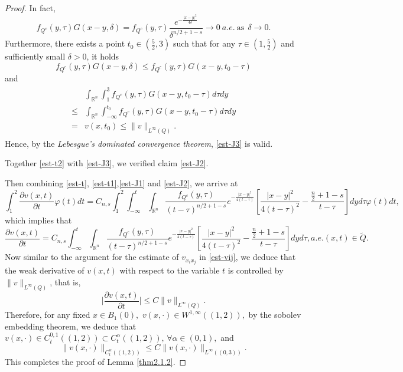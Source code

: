 \documentclass[10pt,a4paper]{amsart}
\newcommand{\R}{\mathbb{R}}
\newcommand{\mb}{\mbox}
\begin{document}
\begin{proof}
In fact,
\[f_{Q^c}(y,\tau)G(x-y,\delta)=f_{Q^c}(y,\tau)\frac{e^{-\frac{|x-y|^2}{4\delta}}}{{\delta}^{n/2+1-s}}\to 0 \ a.e.\ \mb{as}\ \ \delta\to 0. \]
 Furthermore, there exists a point $t_0\in (\frac{5}{2},3)$ such that for any $\tau\in(1,\frac{5}{2})$ and sufficiently small $\delta>0$, it holds
 \[f_{Q^c}(y,\tau)G(x-y,\delta)\leq f_{Q^c}(y,\tau)G(x-y,t_0-\tau)\]
 and \begin{eqnarray*}
\begin{aligned}
&\int_{\R^n}\int_1^3f_{Q^c}(y,\tau)G(x-y,t_0-\tau)d\tau dy\\
\leq &\int_{\R^n}\int_{-\infty}^{t_0}f_{Q^c}(y,\tau)G(x-y,t_0-\tau)d\tau dy\\
=&v(x,t_0)\leq \|v\|_{L^{\infty}(Q)}.\end{aligned}
\end{eqnarray*}
Hence, by the {\em Lebesgue's dominated convergence theorem}, \eqref{est-J3} is valid.

Together \eqref{est-t2} with \eqref{est-J3}, we verified claim \eqref{est-J2}.

Then combining \eqref{est-t}, \eqref{est-t1},\eqref{est-J1} and \eqref{est-J2}, we arrive at
\[\int_1^2\frac{\partial v(x,t)}{\partial t}\varphi(t)dt=C_{n,s}\int_1^2\int_{-\infty}^{t}\int_{\R^n}\frac{f_{Q^c}(y,\tau)}{{(t-\tau)}^{n/2+1-s}} e^{-\frac{|x-y|^2}{4(t-\tau)}}\left[\frac{|x-y|^2}{4(t-\tau)^2}-\frac{\frac{n}{2}+1-s}{t-\tau}\right]dyd\tau\varphi(t)dt,\]
which implies that
\[\frac{\partial v(x,t)}{\partial t}=C_{n,s}\int_{-\infty}^{t}\int_{\R^n}\frac{f_{Q^c}(y,\tau)}{{(t-\tau)}^{n/2+1-s}} e^{-\frac{|x-y|^2}{4(t-\tau)}}\left[\frac{|x-y|^2}{4(t-\tau)^2}-\frac{\frac{n}{2}+1-s}{t-\tau}\right]dyd\tau, a.e. (x,t)\in \tilde{Q}.\]
Now similar to the argument for the estimate of $v_{x_ix_j}$ in \eqref{est-vij}, we deduce that the weak derivative of $v(x,t)$ with respect to the variable $t$ is controlled by $\|v\|_{L^{\infty}(Q)}$, that is,
\[\Bigg|\frac{\partial v(x,t)}{\partial t}\Bigg|\leq C\|v\|_{L^{\infty}(Q)}.\]
Therefore, for any fixed $x\in B_1(0),$ $v(x,\cdot)\in W^{1,\infty}((1,2)),$  by the sobolev  embedding theorem, we deduce that $v(x,\cdot)\in C_t^{0,1}((1,2))\subset C_t^{\alpha}((1,2)),  \, \forall \alpha\in(0, 1),$ and
\[\|v(x,\cdot)\|_{C_t^{\alpha}((1,2))}\leq C \|v(x,\cdot)\|_{L^{\infty}((0,3))}.\]
This completes the proof of Lemma \ref{thm2.1.2}. \end{proof}
\end{document}
